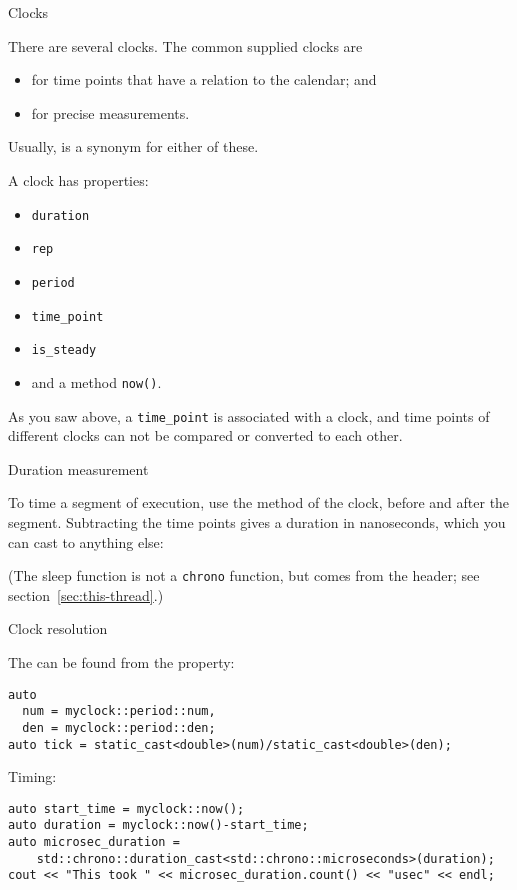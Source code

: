  {Clocks}

There are several clocks. The common supplied clocks
are
\begin{itemize}
\item {} for time points that have a relation to the calendar;
  and
\item {} for precise measurements.
\end{itemize}

Usually,  is a synonym
for either of these.

A clock has properties:
\begin{itemize}
\item \lstinline{duration}
\item \lstinline{rep}
\item \lstinline{period}
\item \lstinline+time_point+
\item \lstinline+is_steady+
\item and a method \lstinline+now()+.
\end{itemize}

As you saw above, a \lstinline+time_point+ is associated with a clock,
and time points of different clocks can not be compared or converted to each other.

 {Duration measurement}

To time a segment of execution, use the  method of the clock,
before and after the segment.
Subtracting the time points gives a duration in nanoseconds,
which you can cast to anything else:
%

(The sleep function is not a \lstinline{chrono} function,
but comes from the  header;
see section~\ref{sec:this-thread}.)

 {Clock resolution}

The  can be found from the  property:
\begin{lstlisting}
auto
  num = myclock::period::num,
  den = myclock::period::den;
auto tick = static_cast<double>(num)/static_cast<double>(den);
\end{lstlisting}

Timing:
\begin{lstlisting}
auto start_time = myclock::now();
auto duration = myclock::now()-start_time;
auto microsec_duration =
    std::chrono::duration_cast<std::chrono::microseconds>(duration);
cout << "This took " << microsec_duration.count() << "usec" << endl;
\end{lstlisting}


